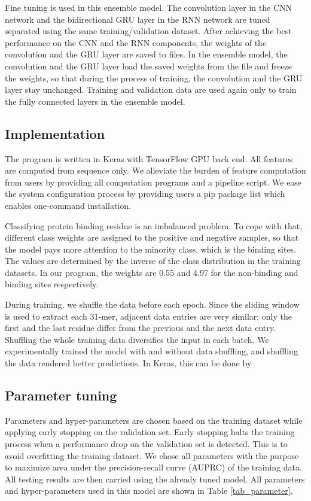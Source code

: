 \documentclass{bioinfo}
\begin{document}
\begin{methods}
Fine tuning is used in this ensemble model. The convolution layer in the CNN network and the bidirectional GRU layer in the RNN network are tuned separated using the same training/validation dataset. After achieving the best performance on the CNN and the RNN components, the weights of the convolution and the GRU layer are saved to files. In the ensemble model, the convolution and the GRU layer load the saved weights from the file and freeze the weights, so that during the process of training, the convolution and the GRU layer stay unchanged. Training and validation data are used again only to train the fully connected layers in the ensemble model.

\subsection{Implementation}
The program is written in Keras \citep{chollet2015keras} with TensorFlow GPU \citep{tensorflow2015-whitepaper} back end. All features are computed from sequence only. We alleviate the burden of feature computation from users by providing all computation programs and a pipeline script. We ease the system configuration process by providing users a pip package list which enables one-command installation. 

Classifying protein binding residue is an imbalanced problem. To cope with that, different class weights \citep{ting2002instance} are assigned to the positive and negative samples, so that the model pays more attention to the minority class, which is the binding sites.  The values are determined by the inverse of the class distribution in the training datasets. In our program, the weights are 0.55 and 4.97 for the non-binding and binding sites respectively. 

During training, we shuffle the data before each epoch. Since the sliding window is used to extract each 31-mer, adjacent data entries are very similar; only the first and the last residue differ from the previous and the next data entry. Shuffling the whole training data diversifies the input in each batch. We experimentally trained the model with and without data shuffling, and shuffling the data rendered better predictions. In Keras, this can be done by 

\subsection{Parameter tuning}
Parameters and hyper-parameters are chosen based on the training dataset while applying early stopping \citep{prechelt1998early} on the validation set. Early stopping halts the training process when a performance drop on the validation set is detected. This is to avoid overfitting the training dataset. We chose all parameters with the purpose to maximize area under the precision-recall curve (AUPRC) of the training data. All testing results are then carried using the already tuned model. All parameters and hyper-parameters used in this model are shown in Table \ref{tab_parameter}. 


\end{methods}
\end{document}
